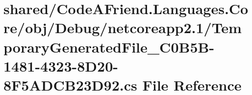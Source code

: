 \hypertarget{shared_2_code_a_friend_8_languages_8_core_2obj_2_debug_2netcoreapp2_81_2_temporary_generated_fil44c72e725bef29f4ca3d54197c1c7209}{}\section{shared/\+Code\+A\+Friend.Languages.\+Core/obj/\+Debug/netcoreapp2.1/\+Temporary\+Generated\+File\+\_\+C0\+B5\+B-\/1481-\/4323-\/8\+D20-\/8\+F5\+A\+D\+C\+B23\+D92.cs File Reference}
\label{shared_2_code_a_friend_8_languages_8_core_2obj_2_debug_2netcoreapp2_81_2_temporary_generated_fil44c72e725bef29f4ca3d54197c1c7209}
